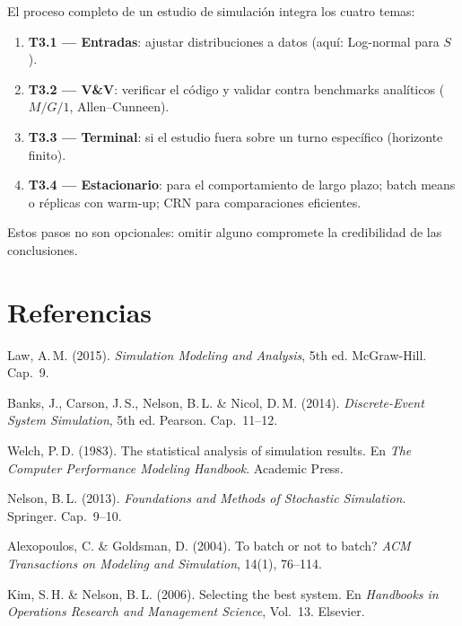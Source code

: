 \documentclass[11pt, letterpaper]{article}
\begin{document}
\begin{notabox}
El proceso completo de un estudio de simulación integra los cuatro temas:
\begin{enumerate}
    \item \textbf{T3.1 — Entradas}: ajustar distribuciones a datos (aquí: Log-normal para $S$).
    \item \textbf{T3.2 — V\&V}: verificar el código y validar contra benchmarks analíticos ($M/G/1$, Allen--Cunneen).
    \item \textbf{T3.3 — Terminal}: si el estudio fuera sobre un turno específico (horizonte finito).
    \item \textbf{T3.4 — Estacionario}: para el comportamiento de largo plazo; batch means o réplicas con warm-up; CRN para comparaciones eficientes.
\end{enumerate}
Estos pasos no son opcionales: omitir alguno compromete la credibilidad de las conclusiones.
\end{notabox}

\section*{Referencias}

\begin{enumerate}[label={[\arabic*]}]
    \item Law, A.\,M. (2015). \textit{Simulation Modeling and Analysis}, 5th ed. McGraw-Hill. Cap.~9.
    \item Banks, J., Carson, J.\,S., Nelson, B.\,L. \& Nicol, D.\,M. (2014). \textit{Discrete-Event System Simulation}, 5th ed. Pearson. Cap.~11--12.
    \item Welch, P.\,D. (1983). The statistical analysis of simulation results. En \textit{The Computer Performance Modeling Handbook}. Academic Press.
    \item Nelson, B.\,L. (2013). \textit{Foundations and Methods of Stochastic Simulation}. Springer. Cap.~9--10.
    \item Alexopoulos, C. \& Goldsman, D. (2004). To batch or not to batch? \textit{ACM Transactions on Modeling and Simulation}, 14(1), 76--114.
    \item Kim, S.\,H. \& Nelson, B.\,L. (2006). Selecting the best system. En \textit{Handbooks in Operations Research and Management Science}, Vol.~13. Elsevier.
\end{enumerate}
\end{document}
